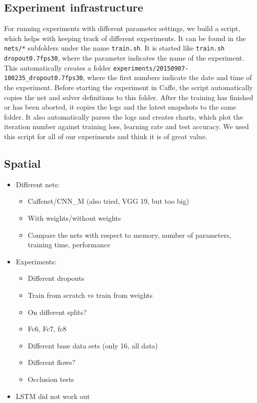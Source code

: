 \subsection{Experiment infrastructure}
For running experiments with different parameter settings, we build a script, which helps with keeping track of different experiments.
It can be found in the \texttt{nets/*} subfolders under the name \texttt{train.sh}.
It is started like \texttt{train.sh dropout0.7fps30}, where the parameter indicates the name of the experiment.
This automatically creates a folder \texttt{experiments/20150907-100235\_dropout0.7fps30}, where the first numbers indicate the date and time of the experiment.
Before starting the experiment in Caffe, the script automatically copies the net and solver definitions to this folder.
After the training has finished or has been aborted, it copies the logs and the latest snapshots to the same folder.
It also automatically parses the logs and creates charts, which plot the iteration number against training loss, learning rate and test accuracy.
We used this script for all of our experiments and think it is of great value.

\subsection{Spatial}
\label{subsec:spatial}

\begin{itemize}
	\item
		Different nets:
		\begin{itemize}
			\item Caffenet/CNN\_M (also tried, VGG 19, but too big)
			\item With weights/without weights
			\item Compare the nets with respect to memory, number of parameters, training time, performance
		\end{itemize}
	\item
		Experiments:
		\begin{itemize}
			\item Different dropouts
			\item Train from scratch vs train from weights
			\item On different splits?
			\item Fc6, Fc7, fc8
			\item Different base data sets (only 16, all data)
			\item Different flows?
			\item Occlusion tests
		\end{itemize}
	\item
		LSTM did not work out
\end{itemize}


